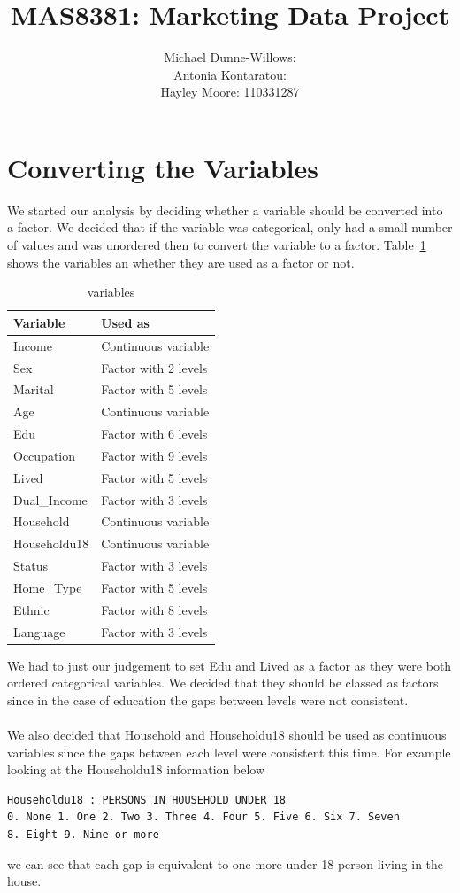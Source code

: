 \documentclass{article}
\begin{document}
\title{MAS8381: Marketing Data Project}
\author{Michael Dunne-Willows:\\
Antonia Kontaratou:\\
Hayley Moore: 110331287}
\maketitle

\section{Converting the Variables}
We started our analysis by deciding whether a variable should be converted into a factor. We decided that if the variable was categorical, only had a small number of values and was unordered then to convert the variable to a factor. Table~\ref{variables} shows the variables an whether they are used as a factor or not.
\begin{table}[H]
\centering
\begin{tabular}{|l|l|}
\hline
\textbf{Variable} &\textbf{Used as}\\
\hline
Income       &Continuous variable  \\
Sex          &Factor with 2 levels \\
Marital      &Factor with 5 levels \\
Age          &Continuous variable  \\
Edu          &Factor with 6 levels\\
Occupation   &Factor with 9 levels\\
Lived        &Factor with 5 levels\\
Dual\_Income &Factor with 3 levels\\
Household    &Continuous variable  \\
Householdu18 &Continuous variable  \\
Status       &Factor with 3 levels \\
Home\_Type   &Factor with 5 levels \\
Ethnic       &Factor with 8 levels \\
Language     &Factor with 3 levels \\
\hline
\end{tabular}
\caption{variables}
\label{variables}
\end{table}
\noindent We had to just our judgement to set \textsf{Edu} and \textsf{Lived} as a factor as they were both ordered categorical variables. We decided that they should be classed as factors since in the case of education the gaps between levels were not consistent.
\\\\
We also decided that \textsf{Household} and \textsf{Householdu18} should be used as continuous variables since the gaps between each level were consistent this time. For example looking at the \textsf{Householdu18} information below
\begin{verbatim}
Householdu18 : PERSONS IN HOUSEHOLD UNDER 18 
0. None 1. One 2. Two 3. Three 4. Four 5. Five 6. Six 7. Seven 
8. Eight 9. Nine or more
\end{verbatim}
we can see that each gap is equivalent to one more under 18 person living in the house.
\end{document}
